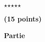 \documentclass[10pt,french]{article}
\newcounter{exercice}\newcommand{\exercice}{\refstepcounter{exercice}\textbf{\large{Exercice \theexercice \ :}}\xspace}
\begin{document}
\begin{center}
$\star$\quad $\star$\quad $\star$\quad $\star$\quad $\star$
\end{center}





\exercice \hfill\textbf{(15 points)}%
\bigskip

\textbf{Partie} 


\end{document}
